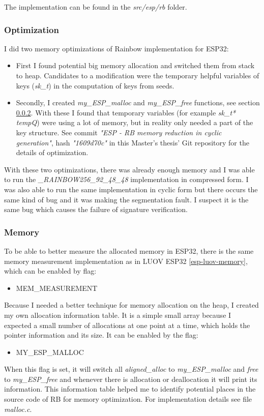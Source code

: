 \documentclass[thesis=M,english]{FITthesis}[2019/12/23]
\begin{document}
\bigskip
\noindent
The implementation can be found in the \textit{src/esp/rb} folder.

\subsubsection{Optimization} \label{rb-opti}
I did two memory optimizations of Rainbow implementation for ESP32:
\begin{itemize}
\item	First I found potential big memory allocation and switched them from stack to heap. Candidates to a modification were the temporary helpful variables of keys (\textit{sk\_t}) in the computation of keys from seeds.

\item	Secondly, I created \textit{my\_ESP\_malloc} and \textit{my\_ESP\_free} functions, see section \ref{esp-rb-memory}. With these I found that temporary variables (for example \textit{sk\_t* tempQ}) were using a lot of memory, but in reality only needed a part of the key structure. See commit \textit{"ESP - RB memory reduction in cyclic generation"}, hash \textit{"1609d70c"} in this Master's thesis' Git repository for the details of optimization.
\end{itemize}
With these two optimizations, there was already enough memory and I was able to run the \textit{\_RAINBOW256\_92\_48\_48} implementation in compressed form. I was also able to run the same implementation in cyclic form but there occurs the same kind of bug and it was making the segmentation fault. I suspect it is the same bug which causes the failure of signature verification.

\subsubsection{Memory} \label{esp-rb-memory}
To be able to better measure the allocated memory in ESP32, there is the same memory measurement implementation as in LUOV ESP32 \ref{esp-luov-memory}, which can be enabled by flag:
\begin{itemize}
\item	MEM\_MEASUREMENT
\end{itemize}
Because I needed a better technique for memory allocation on the heap, I created my own allocation information table. It is a simple small array because I expected a small number of allocations at one point at a time, which holds the pointer information and its size.
It can be enabled by the flag:
\begin{itemize}
\item	MY\_ESP\_MALLOC
\end{itemize}
When this flag is set, it will switch all \textit{aligned\_alloc} to \textit{my\_ESP\_malloc} and \textit{free} to \textit{my\_ESP\_free} and whenever there is allocation or deallocation it will print its information.
This information table helped me to identify potential places in the source code of RB for memory optimization. For implementation details see file \textit{malloc.c}.
\end{document}
